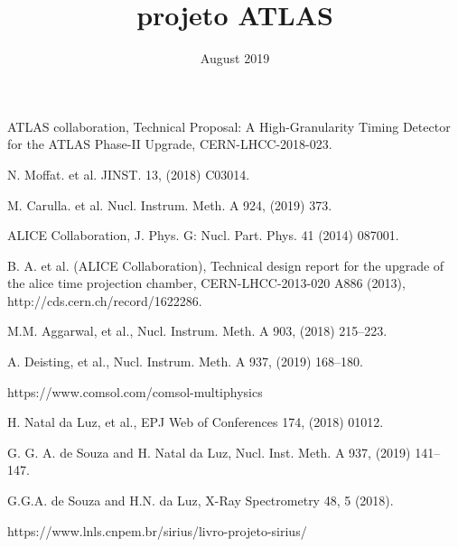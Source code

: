 \documentclass{report}
\title{projeto ATLAS}
\date{August 2019}
\begin{document}





\tableofcontents






%

\begin{thebibliography}{9}

 ATLAS collaboration, Technical Proposal: A High-Granularity Timing Detector for the ATLAS Phase-II Upgrade, CERN-LHCC-2018-023.

 N. Moffat. et al. JINST. 13, (2018) C03014.

 M. Carulla. et al. Nucl. Instrum. Meth. A 924, (2019) 373. 

 ALICE Collaboration, J. Phys. G: Nucl. Part. Phys. 41 (2014) 087001.

 B. A. et al. (ALICE Collaboration), Technical design report for the upgrade of the alice time projection chamber, CERN-LHCC-2013-020
A886 (2013), http://cds.cern.ch/record/1622286.


 M.M. Aggarwal, et al., Nucl. Instrum. Meth. A 903, (2018) 215–223. 

 A. Deisting, et al., Nucl. Instrum. Meth. A 937, (2019) 168–180.

 https://www.comsol.com/comsol-multiphysics

 H. Natal da Luz, et al., EPJ Web of Conferences 174, (2018) 01012.

 G. G. A. de Souza and  H. Natal da Luz, Nucl. Inst. Meth. A 937, (2019) 141–147.

 G.G.A. de Souza and H.N. da Luz, X-Ray Spectrometry 48, 5 (2018).

 https://www.lnls.cnpem.br/sirius/livro-projeto-sirius/



\end{thebibliography}
\end{document}
